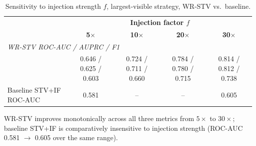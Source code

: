 \begin{table}[t]
\centering
\caption{Sensitivity to injection strength $f$, largest-visible strategy,
WR-STV vs.\ baseline.}
\label{tab:sensitivity}
\begin{tabular}{lcccc}
\toprule
& \multicolumn{4}{c}{\textbf{Injection factor $f$}} \\
& \textbf{5$\times$} & \textbf{10$\times$} & \textbf{20$\times$} & \textbf{30$\times$} \\
\midrule
\multicolumn{5}{l}{\textit{WR-STV ROC-AUC / AUPRC / F1}} \\
& 0.646 / 0.625 / 0.603 & 0.724 / 0.711 / 0.660 & 0.784 / 0.780 / 0.715 & 0.814 / 0.812 / 0.738 \\
\midrule
Baseline STV+IF ROC-AUC & 0.581 & -- & -- & 0.605 \\
\bottomrule
\end{tabular}

\vspace{4pt}
\footnotesize
WR-STV improves monotonically across all three metrics from $5\times$ to
$30\times$; baseline STV+IF is comparatively insensitive to injection
strength (ROC-AUC 0.581 $\rightarrow$ 0.605 over the same range).
\end{table}

